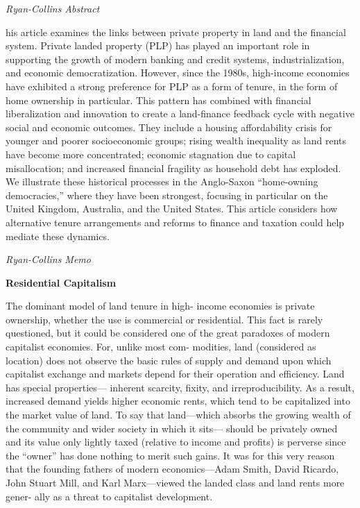 \documentclass[
]{book}
\begin{document}
\emph{Ryan-Collins Abstract}

his article examines the links between private property in land and the financial system. Private landed property (PLP) has played an important role in supporting the growth of modern banking and credit systems, industrialization, and economic democratization. However, since the 1980s, high-income economies have exhibited a strong preference for PLP as a form of tenure, in the form of home ownership in particular. This pattern has combined with financial liberalization and innovation to create a land-finance feedback cycle with negative social and economic outcomes. They include a housing affordability crisis for younger and poorer socioeconomic groups; rising wealth inequality as land rents have become more concentrated; economic stagnation due to capital misallocation; and increased financial fragility as household debt has exploded. We illustrate these historical processes in the Anglo-Saxon ``home-owning democracies,'' where they have been strongest, focusing in particular on the United Kingdom, Australia, and the United States. This article considers how alternative tenure arrangements and reforms to finance and taxation could help mediate these dynamics.

\emph{Ryan-Collins Memo}

\textbf{Residential Capitalism}

The dominant model of land tenure in high-­
income economies is
private ownership, whether the use is commercial or residential. This
fact is rarely questioned, but it could be considered one of the great
paradoxes of modern capitalist economies. For, unlike most com-
modities, land (considered as location) does not observe the basic
rules of supply and demand upon which capitalist exchange and
markets depend for their operation and efficiency. Land has special
properties---­
inherent scarcity, fixity, and irreproducibility.
As a result, increased demand yields higher economic rents,
which tend to be capitalized into the market value of land.
To say that land---­which absorbs the
growing wealth of the community and wider society in which it sits---­
should be privately owned and its value only lightly taxed (relative to
income and profits) is perverse since the ``owner'' has done nothing to
merit such gains. It was for this very reason that the founding fathers
of modern economics---­Adam Smith, David Ricardo, John Stuart Mill,
and Karl Marx---­viewed the landed class and land rents more gener-
ally as a threat to capitalist development.
\end{document}
